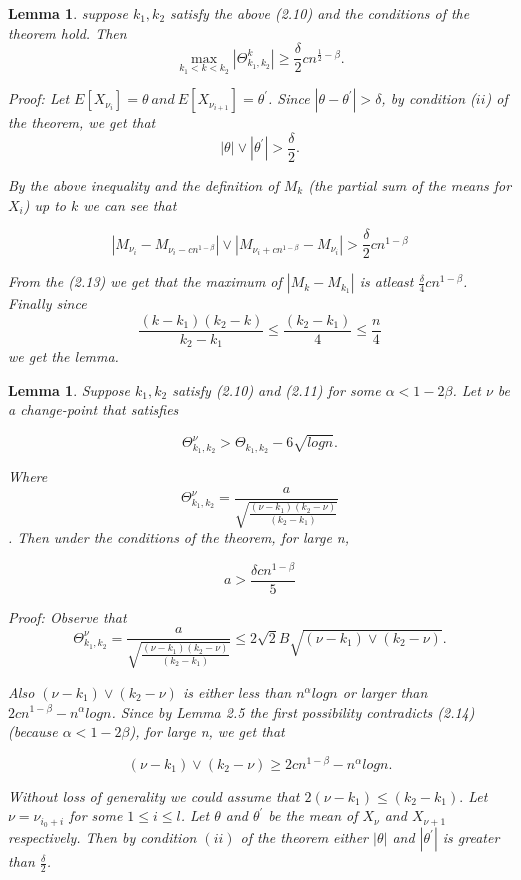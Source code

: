 \documentclass[a4paper, 12pt, notitlepage]{report}
\newtheorem{lemma}[theorem]{Lemma}
\begin{document}
\begin{lemma}
%
suppose \(k_1, k_2\) satisfy the above (2.10) and the conditions of the theorem hold.
Then
\[\max_{k_1<k<k_2}|\Theta^k_{k_1,k_2}| \geq \frac{\delta}{2}cn^{\frac{1}{2} - \beta}.\]

Proof: \newline
Let \(E[X_{\nu_i}] = \theta \ and \ E[X_{\nu_{i + 1}}] = \theta^{'}\). Since \(| \theta - \theta^{'}| > \delta\), by condition (\(ii\)) of the theorem, we get that
\[ |\theta| \vee |\theta^{'}| > \frac{\delta}{2}.\]

By the above inequality and the definition of $M_k$ (the partial sum of the means for \(X_i\)) up to $k$ we can see that

\[|M_{\nu_i} - M_{\nu_i - cn^{1-\beta}}| \vee |M_{\nu_i + cn^{1-\beta}} - M_{\nu_i}| > \frac{\delta}{2}cn^{1 - \beta}\]

From the (2.13) we get that the maximum of \(|M_k - M_{k_1}|\) is atleast \(\frac{\delta}{4}cn^{1-\beta}\). Finally since \[\frac{(k - k_1)(k_2 - k)}{k_2 -k_1} \leq \frac{(k_2-k_1)}{4} \leq \frac{n}{4}\] we get the lemma.

\end{lemma}

\begin{lemma}
Suppose \(k_1, k_2\) satisfy (2.10) and (2.11) for some \(\alpha < 1 -2\beta \). Let $\nu$ be a change-point that satisfies

\[ \Theta^\nu_{k_1, k_2} > \Theta_{k_1, k_2} - 6\sqrt{log n}.\]

Where \[\Theta^\nu_{k_1, k_2} = \frac{a}{\sqrt{\frac{(\nu - k_1)(k_2 - \nu)}{(k_2 - k_1)}}}\]. Then under the conditions of the theorem, for large n,

\[a > \frac{\delta cn^{1 - \beta}}{5}\]

Proof: \newline
Observe that
 \[\Theta^\nu_{k_1, k_2} = \frac{a}{\sqrt{\frac{(\nu - k_1)(k_2 - \nu)}{(k_2 - k_1)}}} \leq 2\sqrt{2}B\sqrt{(\nu -  k_1) \vee (k_2 - \nu)}.\]

Also \((\nu - k_1) \vee (k_2 - \nu)\) is either less than \(n^\alpha log n\) or larger than \(2cn^{1 - \beta} - n^\alpha log n\). Since by Lemma 2.5 the first possibility contradicts (2.14) (because \( \alpha < 1 - 2\beta\)), for large n, we get that

\[ (\nu -  k_1) \vee (k_2 - \nu) \geq 2cn^{1- \beta} - n^\alpha log n.\]

Without loss of generality we could assume that \(2(\nu - k_1) \leq (k_2 - k_1).\) Let \(\nu = \nu_{i_0 + i}\) for some \(1 \leq i \leq l\). Let $\theta$ and $\theta^{'}$ be the mean of $X_\nu$ and $X_{\nu + 1}$ respectively. Then by condition \((ii)\) of the theorem either $|\theta|$ and $|\theta^{'}|$ is greater than $\frac{\delta}{2}$.
\end{lemma}
\end{document}
